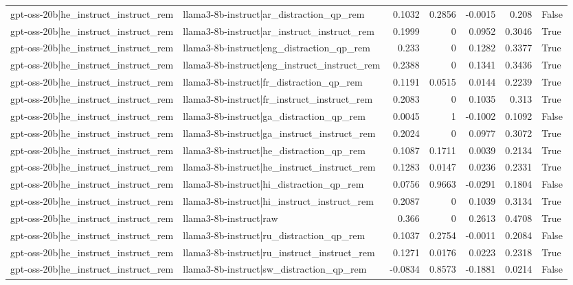 \begin{table}
\begin{tabular}{l l r r r r l}
gpt-oss-20b|he_instruct_instruct_rem & llama3-8b-instruct|ar_distraction_qp_rem & 0.1032 & 0.2856 & -0.0015 & 0.208 & False \\
gpt-oss-20b|he_instruct_instruct_rem & llama3-8b-instruct|ar_instruct_instruct_rem & 0.1999 & 0 & 0.0952 & 0.3046 & True \\
gpt-oss-20b|he_instruct_instruct_rem & llama3-8b-instruct|eng_distraction_qp_rem & 0.233 & 0 & 0.1282 & 0.3377 & True \\
gpt-oss-20b|he_instruct_instruct_rem & llama3-8b-instruct|eng_instruct_instruct_rem & 0.2388 & 0 & 0.1341 & 0.3436 & True \\
gpt-oss-20b|he_instruct_instruct_rem & llama3-8b-instruct|fr_distraction_qp_rem & 0.1191 & 0.0515 & 0.0144 & 0.2239 & True \\
gpt-oss-20b|he_instruct_instruct_rem & llama3-8b-instruct|fr_instruct_instruct_rem & 0.2083 & 0 & 0.1035 & 0.313 & True \\
gpt-oss-20b|he_instruct_instruct_rem & llama3-8b-instruct|ga_distraction_qp_rem & 0.0045 & 1 & -0.1002 & 0.1092 & False \\
gpt-oss-20b|he_instruct_instruct_rem & llama3-8b-instruct|ga_instruct_instruct_rem & 0.2024 & 0 & 0.0977 & 0.3072 & True \\
gpt-oss-20b|he_instruct_instruct_rem & llama3-8b-instruct|he_distraction_qp_rem & 0.1087 & 0.1711 & 0.0039 & 0.2134 & True \\
gpt-oss-20b|he_instruct_instruct_rem & llama3-8b-instruct|he_instruct_instruct_rem & 0.1283 & 0.0147 & 0.0236 & 0.2331 & True \\
gpt-oss-20b|he_instruct_instruct_rem & llama3-8b-instruct|hi_distraction_qp_rem & 0.0756 & 0.9663 & -0.0291 & 0.1804 & False \\
gpt-oss-20b|he_instruct_instruct_rem & llama3-8b-instruct|hi_instruct_instruct_rem & 0.2087 & 0 & 0.1039 & 0.3134 & True \\
gpt-oss-20b|he_instruct_instruct_rem & llama3-8b-instruct|raw & 0.366 & 0 & 0.2613 & 0.4708 & True \\
gpt-oss-20b|he_instruct_instruct_rem & llama3-8b-instruct|ru_distraction_qp_rem & 0.1037 & 0.2754 & -0.0011 & 0.2084 & False \\
gpt-oss-20b|he_instruct_instruct_rem & llama3-8b-instruct|ru_instruct_instruct_rem & 0.1271 & 0.0176 & 0.0223 & 0.2318 & True \\
gpt-oss-20b|he_instruct_instruct_rem & llama3-8b-instruct|sw_distraction_qp_rem & -0.0834 & 0.8573 & -0.1881 & 0.0214 & False \\

\end{tabular}
\end{table}
